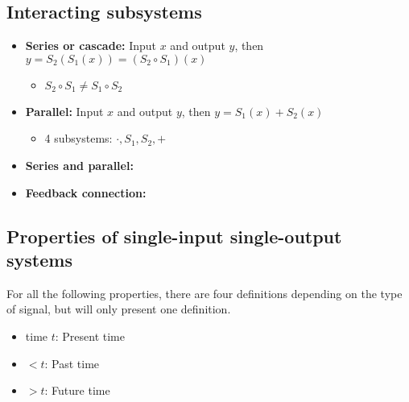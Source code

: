 \subsection{Interacting subsystems}
\begin{definition}
    \begin{itemize}
        \item \textbf{Series or cascade:} Input $x$ and output $y$, then $y = S_2(S_1(x)) = (S_2 \circ S_1)(x)$
        \begin{itemize}
            \item $S_2 \circ S_1 \neq S_1 \circ S_2$
        \end{itemize}
        \item \textbf{Parallel:} Input $x$ and output $y$, then $y=S_1 (x) + S_2 (x)$
        \begin{itemize}
            \item 4 subsystems: $\cdot, S_1, S_2, +$
        \end{itemize}
        \item \textbf{Series and parallel:}
        \item \textbf{Feedback connection:}
    \end{itemize}
\end{definition}

\subsection{Properties of single-input single-output systems}
    For all the following properties, there are four definitions depending on the type of signal, but will only present one definition.
    \begin{intuition}
        \begin{itemize}
            \item time $t$: Present time
            \item $<t$: Past time 
            \item $>t$: Future time 
        \end{itemize}
    \end{intuition}

